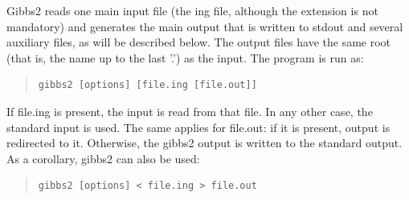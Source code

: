 \documentclass[a4paper]{article}
\begin{document}
Gibbs2 reads one main input file (the ing file, although the extension
is not mandatory) and generates the main output that is written to
stdout and several auxiliary files, as will be described below. The
output files have the same root (that is, the name up to the last '.')
as the input. The program is run as:
%
\begin{quote}
\begin{verbatim}
gibbs2 [options] [file.ing [file.out]]
\end{verbatim}
\end{quote}

If file.ing is present, the input is read from that file. In any other
case, the standard input is used. The same applies for file.out: if it
is present, output is redirected to it. Otherwise, the gibbs2 output
is written to the standard output. As a corollary, gibbs2 can also be
used:
%
\begin{quote}
\begin{verbatim}
gibbs2 [options] < file.ing > file.out
\end{verbatim}
\end{quote}
\end{document}
